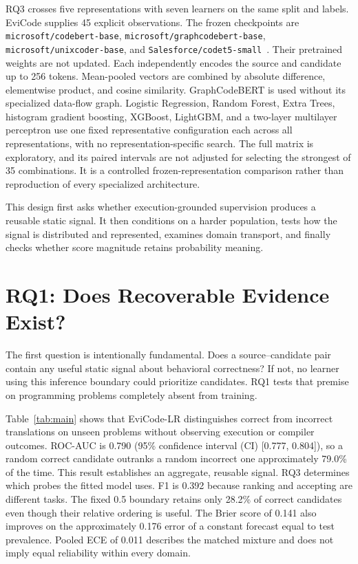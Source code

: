 \documentclass[conference]{IEEEtran}
\begin{document}
RQ3 crosses five representations with seven learners on the same split and labels. EviCode supplies 45 explicit observations. The frozen checkpoints are \texttt{microsoft/codebert-base}, \texttt{microsoft/graphcodebert-base}, \texttt{microsoft/unixcoder-base}, and \texttt{Salesforce/codet5-small}~\cite{feng2020codebert,guo2021graphcodebert,guo2022unixcoder,wang2021codet5}. Their pretrained weights are not updated. Each independently encodes the source and candidate up to 256 tokens. Mean-pooled vectors are combined by absolute difference, elementwise product, and cosine similarity. GraphCodeBERT is used without its specialized data-flow graph. Logistic Regression, Random Forest, Extra Trees, histogram gradient boosting, XGBoost, LightGBM, and a two-layer multilayer perceptron use one fixed representative configuration each across all representations, with no representation-specific search. The full matrix is exploratory, and its paired intervals are not adjusted for selecting the strongest of 35 combinations. It is a controlled frozen-representation comparison rather than reproduction of every specialized architecture.

This design first asks whether execution-grounded supervision produces a reusable static signal. It then conditions on a harder population, tests how the signal is distributed and represented, examines domain transport, and finally checks whether score magnitude retains probability meaning.

\section{RQ1: Does Recoverable Evidence Exist?}
\label{sec:rq1}
The first question is intentionally fundamental. Does a source--candidate pair contain any useful static signal about behavioral correctness? If not, no learner using this inference boundary could prioritize candidates. RQ1 tests that premise on programming problems completely absent from training.

Table~\ref{tab:main} shows that EviCode-LR distinguishes correct from incorrect translations on unseen problems without observing execution or compiler outcomes. ROC-AUC is 0.790 (95\% confidence interval (CI) [0.777, 0.804]), so a random correct candidate outranks a random incorrect one approximately 79.0\% of the time. This result establishes an aggregate, reusable signal. RQ3 determines which probes the fitted model uses. F1 is 0.392 because ranking and accepting are different tasks. The fixed 0.5 boundary retains only 28.2\% of correct candidates even though their relative ordering is useful. The Brier score of 0.141 also improves on the approximately 0.176 error of a constant forecast equal to test prevalence. Pooled ECE of 0.011 describes the matched mixture and does not imply equal reliability within every domain.
\end{document}
